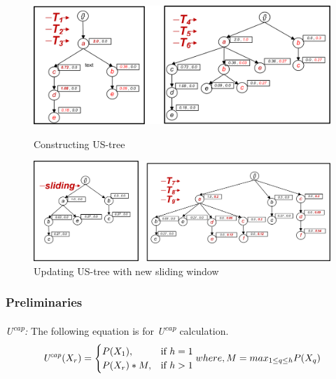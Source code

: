 \documentclass[conference]{IEEEtran}
\begin{document}
%


\begin{figure}[t]
    \begin{minipage}{0.5\linewidth}
        \centering
  		\includegraphics[width=.9\textwidth]{visio/sim_1_6_V2}
  		\caption{Constructing US-tree}
  		\label{figure:t1_6}
    \end{minipage}%
    \begin{minipage}{0.5\linewidth}
         \centering
  		 \includegraphics[width=.9\textwidth]{visio/sim_06_slide_789_V2}
  		 \caption{Updating US-tree with new sliding window}
  		 \label{figure:t7_9}
    \end{minipage}	
\end{figure}


\subsubsection{Preliminaries}
\emph{U\textsuperscript{cap}:}
    The following equation is for \emph{U\textsuperscript{cap}} calculation.
	{\footnotesize
    \begin{equation}\label{equation:cap}
	\text{\emph{U\textsuperscript{cap}}}(X_r) =\begin{cases}
				P(X_1), & \text{if $ h = 1$}\\
				P(X_r)*M, & \text{if $ h > 1$}
             
		\end{cases}
where,\\ M=max_{1\leq q\leq h}P(X_q)
\end{equation}}
\end{document}
